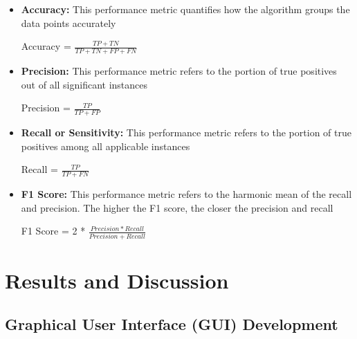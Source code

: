 \documentclass[journal]{./IEEE/IEEEtran}
\begin{document}
\begin{itemize}
  \item \textbf{Accuracy:} This performance metric quantifies how the algorithm groups the data points accurately  {\cite{perEvalMetrics}} \\

    \begin{center}
    \fontsize{12pt}{12pt}\selectfont
    Accuracy = \(\frac{TP + TN}{TP + TN + FP + FN }\)
    \end{center} \bigskip
  
  \item \textbf{Precision:} This performance metric refers to the portion of true positives out of all significant instances  {\cite{perEvalMetrics}} \\

    \begin{center}
    \fontsize{12pt}{12pt}\selectfont
    Precision = \(\frac{TP}{TP + FP}\)
    \end{center} \bigskip

  \item \textbf{Recall or Sensitivity:} This performance metric refers to the portion of true positives among all applicable instances  {\cite{perEvalMetrics}} \\

    \begin{center}
    \fontsize{12pt}{12pt}\selectfont
    Recall = \(\frac{TP}{TP + FN}\)
    \end{center} \bigskip

  \item \textbf{F1 Score:} This performance metric refers to the harmonic mean of the recall and precision. The higher the F1 score, the closer the precision and recall  {\cite{perEvalMetrics}}\\

  \begin{center}
  \fontsize{12pt}{12pt}\selectfont
  F1 Score = 2 * \(\frac{Precision * Recall}{Precision + Recall}\)
  \end{center} \bigskip

\end{itemize}

\section{Results and Discussion}


\subsection {Graphical User Interface (GUI) Development}
\end{document}
